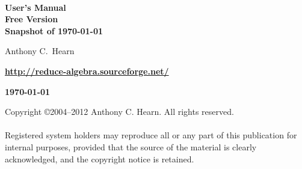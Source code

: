 \begin{titlepage}
\setcounter{page}{-1}
\vspace*{\fill}
\begin{center}

{\Huge\bf {\REDUCE}} \\ [0.2cm]
{\LARGE\bf User's Manual\vspace{0.4cm} \\
  Free Version\\
  Snapshot of \today

}

\vspace{0.5in}\large\bf

Anthony C.\ Hearn %

\vspace{0.1in}

\textbf{\url{http://reduce-algebra.sourceforge.net/}}

\vspace{0.5in}

\large\bf \today

\end{center}
\vspace{3.0in}
\end{titlepage}

\newpage
\vspace*{3.0in}
\noindent Copyright \copyright 2004--2012 Anthony C. Hearn.  All rights reserved. \\
\mbox{}\\
%
\noindent Registered system holders may reproduce all or any part of this
publication for internal purposes, provided that the source of the
material is clearly acknowledged, and the copyright notice is retained.

